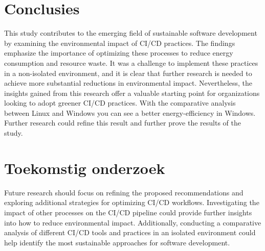 \documentclass[a0,portrait]{hogent-poster}
\begin{document}
\begin{multicols}{2}

\section{Conclusies}
This study contributes to the emerging field of sustainable software development by examining the environmental impact of CI/CD practices. The findings emphasize the importance of optimizing these processes to reduce energy consumption and resource waste. It was a challenge to implement these practices in a non-isolated environment, and it is clear that further research is needed to achieve more substantial reductions in environmental impact. Nevertheless, the insights gained from this research offer a valuable starting point for organizations looking to adopt greener CI/CD practices. With the comparative analysis between Linux and Windows you can see a better energy-efficiency in Windows. Further research could refine this result and further prove the results of the study.

\section{Toekomstig onderzoek}
Future research should focus on refining the proposed recommendations and exploring additional strategies for optimizing CI/CD workflows. Investigating the impact of other processes on the CI/CD pipeline could provide further insights into how to reduce environmental impact. Additionally, conducting a comparative analysis of different CI/CD tools and practices in an isolated environment could help identify the most sustainable approaches for software development.


\end{multicols}
\end{document}
